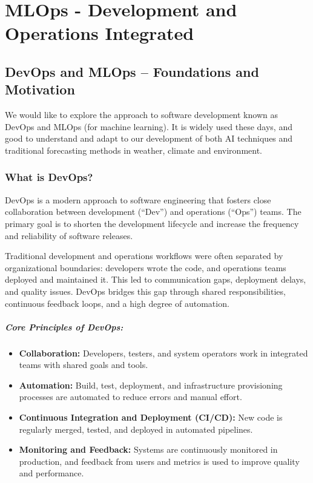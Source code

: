 \chapter{MLOps - Development and Operations Integrated}


%
\section{DevOps and MLOps – Foundations and Motivation}

We would like to explore the approach to software development known as DevOps and MLOps (for machine learning). It is widely used these days, and good to understand and adapt to our development of both AI techniques and traditional forecasting methods in weather, climate and environment. 

%
\subsection{What is DevOps?}

DevOps is a modern approach to software engineering that fosters close collaboration between development (``Dev'') and operations (``Ops'') teams. The primary goal is to shorten the development lifecycle and increase the frequency and reliability of software releases.

Traditional development and operations workflows were often separated by organizational boundaries: developers wrote the code, and operations teams deployed and maintained it. This led to communication gaps, deployment delays, and quality issues. DevOps bridges this gap through shared responsibilities, continuous feedback loops, and a high degree of automation.

\paragraph{Core Principles of DevOps:}
\begin{itemize}
	\item \textbf{Collaboration:} Developers, testers, and system operators work in integrated teams with shared goals and tools.
	\item \textbf{Automation:} Build, test, deployment, and infrastructure provisioning processes are automated to reduce errors and manual effort.
	\item \textbf{Continuous Integration and Deployment (CI/CD):} New code is regularly merged, tested, and deployed in automated pipelines.
	\item \textbf{Monitoring and Feedback:} Systems are continuously monitored in production, and feedback from users and metrics is used to improve quality and performance.
\end{itemize}

